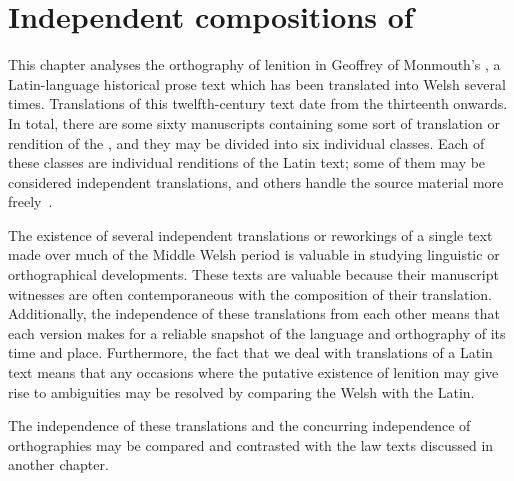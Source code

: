 \chapter{Independent compositions of }
This chapter analyses the orthography of lenition in Geoffrey of Monmouth's , a Latin-language historical prose text which has been translated into Welsh several times.
Translations of this twelfth-century text date from the thirteenth onwards.
In total, there are some sixty manuscripts containing some sort of translation or rendition of the , and they may be divided into six individual classes.
Each of these classes are individual renditions of the Latin text; some of them may be considered independent translations, and others handle the source material more freely~\autocite[xxiv-xxxi]{roberts_brut_1971}.

The existence of several independent translations or reworkings of a single text made over much of the Middle Welsh period is valuable in studying linguistic or orthographical developments.
These texts are valuable because their manuscript witnesses are often contemporaneous with the composition of their translation. Additionally, the independence of these translations from each other means that each version makes for a reliable snapshot of the language and orthography of its time and place.
Furthermore, the fact that we deal with translations of a Latin text means that any occasions where the putative existence of lenition may give rise to ambiguities may be resolved by comparing the Welsh with the Latin. 

The independence of these translations and the concurring independence of orthographies may be compared and contrasted with the law texts discussed in another chapter.


